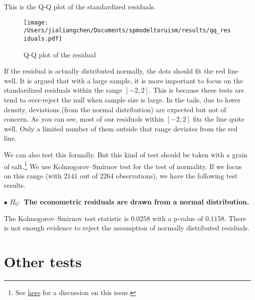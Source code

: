 \documentclass[11pt,a4paper]{amsart}
\theoremstyle{plain}
\theoremstyle{definition}
\begin{document}
This is the Q-Q plot of the standardized residuals.
\begin{figure}[hbt]
	{\centering \texttt{[image: /Users/jialiangchen/Documents/spmodeltoruism/results/qq\_residuals.pdf]}}
	\caption{Q-Q plot of the residual}\label{F:qq_residuals}
\end{figure}

If the residual is actually distributed normally, the dots should fit the red line well. It is argued that with a large sample, it is more important to focus on the standardized residuals within the range $[-2, 2]$. This is because these tests are tend to over-reject the null when  sample size is large.  In the tails, due to lower density, deviations (from the normal distribution) are expected but not of concern. As you can see, most of our residuals within $[-2, 2]$ fits the line quite well. Only a limited number of them outside that range deviates from the red line.

We can also test this formally. But this kind of test should be taken with a grain of salt.\footnote{See \href{https://stats.stackexchange.com/questions/2492/is-normality-testing-essentially-useless}{here} for a discussion on this issue.} We use Kolmogorov–Smirnov test for the test of normality. If we focus on this range (with $2141$ out of $2264$ observations), we have the following test results.

$\bullet$ \textbf{$H_{0}:$ The econometric residuals are drawn from a normal distribution.} 

The Kolmogorov–Smirnov test statistic is  $0.0258$ with a p-value of $0.1158$. There is not enough evidence to reject the assumption of normally distributed residuals. 



\section{Other tests}

\printbibliography
\end{document}
